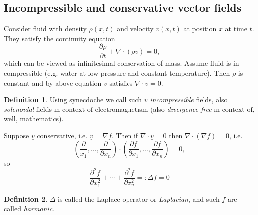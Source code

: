 \documentclass[a4paper]{article}
\theoremstyle{definition}
\newtheorem{defn}{Definition}[subsection]
\begin{document}
\subsection{Incompressible and conservative vector fields}
Consider fluid with density $\rho (x,t)$ and velocity $v(x,t)$ at position $x$ at time $t$. They satisfy the continuity equation
\[
\frac{\partial \rho}{\partial t}+\nabla \cdot (\rho \underline v)=0,
\]
which can be viewed as infinitesimal conservation of mass. Assume fluid is in compressible (e.g. water at low pressure and constant temperature). Then $\rho$ is constant and by above equation $v$ satisfies $\nabla \cdot v=0$.
\begin{defn}
Using synecdoche we call such $v$ \textit{incompressible} fields, also \textit{solenoidal} fields in context of electromagnetism (also \textit{divergence-free} in context of, well, mathematics).
\end{defn}
Suppose $\underline v$ conservative, i.e. $\underline v =\nabla f$. Then if $\nabla \cdot \underline v=0$ then $\nabla \cdot (\nabla f)=0$, i.e.
\[
\left( \frac{\partial}{x_1},\ldots,\frac{\partial}{\partial x_n} \right) \cdot \left( \frac{\partial f}{\partial x_1},\ldots,\frac{\partial f}{\partial x_n} \right) =0,
\]
so
\[
\frac{\partial ^2 f}{\partial x_1^2}+\cdots +\frac{\partial ^2 f}{\partial x_n^2} =: \Delta f = 0
\]
\begin{defn}
$\Delta$ is called the Laplace operator or \textit{Laplacian}, and such $f$ are called \textit{harmonic}.
\end{defn}
\end{document}

